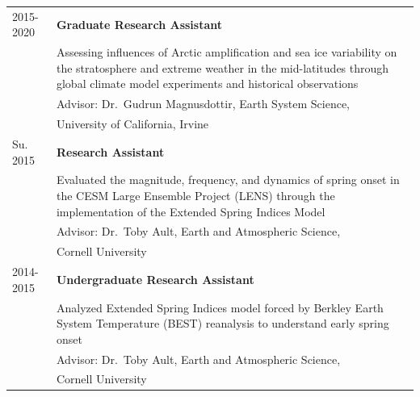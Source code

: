 \documentclass[margin,line,palatino,courier,10pt]{res}
\begin{document}
\begin{resume}
\begin{tabular}{@{}p{0.9in}p{4in}}
2015-2020 & \textbf{Graduate Research Assistant}\\
& Assessing influences of Arctic amplification and sea ice variability on the stratosphere and extreme weather in the mid-latitudes through global climate model experiments and historical observations\\
& \hspace{0.2in} Advisor: Dr.\ Gudrun Magnusdottir, Earth System Science,\\
& \vspace{-0.18in}\hspace{0.2in} University of California, Irvine\\

Su. 2015 & \textbf{Research Assistant}\\
& Evaluated the magnitude, frequency, and dynamics of spring onset in the CESM Large Ensemble Project (LENS) through the implementation of the Extended Spring Indices Model \\
& \hspace{0.2in} Advisor: Dr.\ Toby Ault, Earth and Atmospheric Science,\\
& \vspace{-0.18in}\hspace{0.2in} Cornell University\\

2014-2015 & \textbf{Undergraduate Research Assistant}\\
& Analyzed Extended Spring Indices model forced by Berkley Earth System Temperature (BEST) reanalysis to understand early spring onset\\
& \hspace{0.2in} Advisor: Dr.\ Toby Ault, Earth and Atmospheric Science, \\
& \vspace{-0.18in}\hspace{0.2in} Cornell University\\
\end{tabular}

\vspace{-0.1in}
\noindent\textcolor{Cerulean}{\makebox[\linewidth][r]{\rule{\textwidth}{5pt}}}
\vspace{-0.3in}


\end{resume}
\end{document}
